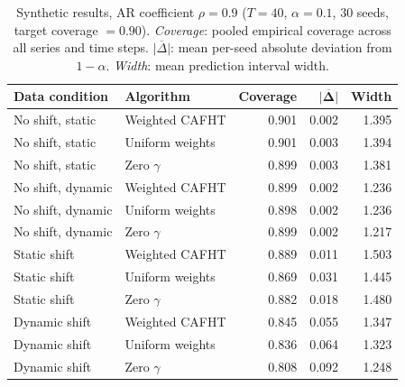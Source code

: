 \begin{table}[ht]
\centering
\small
\setlength{\tabcolsep}{8pt}
\renewcommand{\arraystretch}{1.15}
\caption{%
  Synthetic results, AR coefficient $\rho=0.9$ ($T=40$, $\alpha=0.1$, 30 seeds, target coverage $= 0.90$). \textit{Coverage}: pooled empirical coverage across all series and time steps. $\overline{|\Delta|}$: mean per-seed absolute deviation from $1-\alpha$. \textit{Width}: mean prediction interval width.
}
\label{tab:synthetic_ar09}
\begin{tabular}{@{} llrrr @{}}
\toprule
{\bfseries Data condition} & {\bfseries Algorithm}  & {\bfseries Coverage} & $\boldsymbol{\overline{|\Delta|}}$ & {\bfseries Width} \\
\midrule
No shift, static
  & Weighted CAFHT     & 0.901 & 0.002 & 1.395 \\
No shift, static
  & Uniform weights    & 0.901 & 0.003 & 1.394 \\
No shift, static
  & Zero $\gamma$      & 0.899 & 0.003 & 1.381 \\
\midrule
No shift, dynamic
  & Weighted CAFHT     & 0.899 & 0.002 & 1.236 \\
No shift, dynamic
  & Uniform weights    & 0.898 & 0.002 & 1.236 \\
No shift, dynamic
  & Zero $\gamma$      & 0.899 & 0.002 & 1.217 \\
\midrule
Static shift
  & Weighted CAFHT     & 0.889 & 0.011 & 1.503 \\
Static shift
  & Uniform weights    & 0.869 & 0.031 & 1.445 \\
Static shift
  & Zero $\gamma$      & 0.882 & 0.018 & 1.480 \\
\midrule
Dynamic shift
  & Weighted CAFHT     & 0.845 & 0.055 & 1.347 \\
Dynamic shift
  & Uniform weights    & 0.836 & 0.064 & 1.323 \\
Dynamic shift
  & Zero $\gamma$      & 0.808 & 0.092 & 1.248 \\
\bottomrule
\end{tabular}
\end{table}
